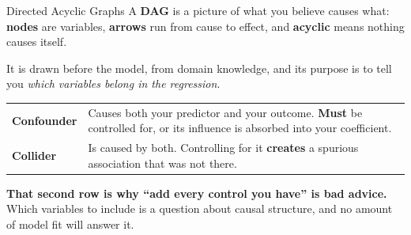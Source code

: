 \documentclass[aspectratio=169, 11pt]{beamer}
\begin{document}
\begin{frame}{Directed Acyclic Graphs}
  A \textbf{DAG} is a picture of what you believe causes what: \textbf{nodes} are variables,
  \textbf{arrows} run from cause to effect, and \textbf{acyclic} means nothing causes itself.

  \vspace{0.15cm}
  It is drawn before the model, from domain knowledge, and its purpose is to tell you
  \emph{which variables belong in the regression}.

  \begin{center}
    {\small
    \begin{tabular}{p{2.6cm}p{9.6cm}}
      \toprule
      \textbf{Confounder} & Causes both your predictor and your outcome. \textbf{Must} be
      controlled for, or its influence is absorbed into your coefficient. \\[3pt]
      \textbf{Collider} & Is caused by both. Controlling for it \textbf{creates} a spurious
      association that was not there. \\
      \bottomrule
    \end{tabular}
    }
  \end{center}

  \vspace{0.05cm}
  \textbf{That second row is why ``add every control you have'' is bad advice.} Which variables
  to include is a question about causal structure, and no amount of model fit will answer it.

  \vspace{0.1cm}
\end{frame}
\end{document}
